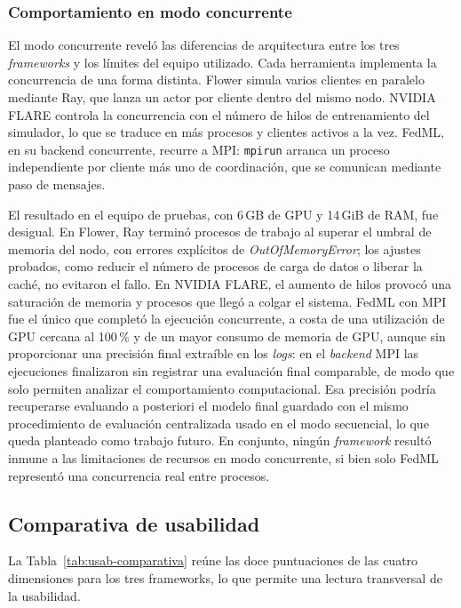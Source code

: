 \subsubsection{Comportamiento en modo concurrente}\label{sec:concurrencia}

El modo concurrente reveló las diferencias de arquitectura entre los tres
\textit{frameworks} y los límites del equipo utilizado. Cada herramienta implementa la
concurrencia de una forma distinta. Flower simula varios clientes en paralelo mediante Ray, que
lanza un actor por cliente dentro del mismo nodo. NVIDIA FLARE controla la concurrencia con el
número de hilos de entrenamiento del simulador, lo que se traduce en más procesos y clientes
activos a la vez. FedML, en su backend concurrente, recurre a MPI: \texttt{mpirun} arranca un
proceso independiente por cliente más uno de coordinación, que se comunican mediante paso de
mensajes.

El resultado en el equipo de pruebas, con 6\,GB de GPU y 14\,GiB de RAM, fue desigual. En Flower,
Ray terminó procesos de trabajo al superar el umbral de memoria del nodo, con errores explícitos
de \textit{OutOfMemoryError}; los ajustes probados, como reducir el número de procesos de carga
de datos o liberar la caché, no evitaron el fallo. En NVIDIA FLARE, el aumento de hilos provocó
una saturación de memoria y procesos que llegó a colgar el sistema. FedML con MPI fue el único
que completó la ejecución concurrente, a costa de una utilización de GPU cercana al 100\,\% y de
un mayor consumo de memoria de GPU, aunque sin proporcionar una precisión final extraíble en los
\textit{logs}: en el \textit{backend} MPI las ejecuciones finalizaron sin registrar una
evaluación final comparable, de modo que solo permiten analizar el comportamiento computacional.
Esa precisión podría recuperarse evaluando a posteriori el modelo final guardado con el mismo
procedimiento de evaluación centralizada usado en el modo secuencial, lo que queda planteado como
trabajo futuro. En conjunto, ningún \textit{framework} resultó inmune a las limitaciones de
recursos en modo concurrente, si bien solo FedML representó una concurrencia real entre procesos.

\subsection{Comparativa de usabilidad}\label{sec:usab-comparativa}

La Tabla~\ref{tab:usab-comparativa} reúne las doce puntuaciones de las cuatro dimensiones
para los tres frameworks, lo que permite una lectura transversal de la usabilidad.

